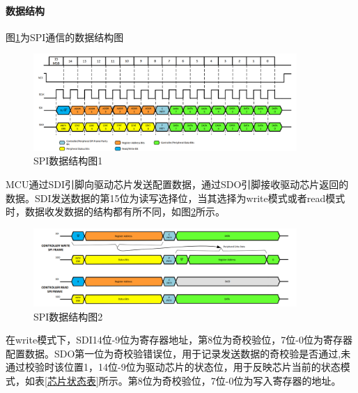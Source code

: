 \paragraph{数据结构}
图\ref{SPI数据结构图1}为SPI通信的数据结构图
\begin{figure}[ht]
	\centering
	\includegraphics[width=10cm]{figure/SPI Frame.png}
	\caption{SPI数据结构图1}
	\label{SPI数据结构图1}
\end{figure}
MCU通过SDI引脚向驱动芯片发送配置数据，通过SDO引脚接收驱动芯片返回的数据。SDI发送数据的第15位为读写选择位，当其选择为write模式或者read模式时，数据收发数据的结构都有所不同，如图\ref{SPI数据结构图2}所示。
\begin{figure}[ht]
	\centering
	\includegraphics[width=10cm]{figure/SPI Transfer Sequence.png}
	\caption{SPI数据结构图2}
	\label{SPI数据结构图2}
\end{figure}
在write模式下，SDI14位-9位为寄存器地址，第8位为奇校验位，7位-0位为寄存器配置数据。SDO第一位为奇校验错误位，用于记录发送数据的奇校验是否通过,未通过校验时该位置1，14位-9位为驱动芯片的状态位，用于反映芯片当前的状态模式，如表\ref{芯片状态表}所示。第8位为奇校验位，7位-0位为写入寄存器的地址。\par

